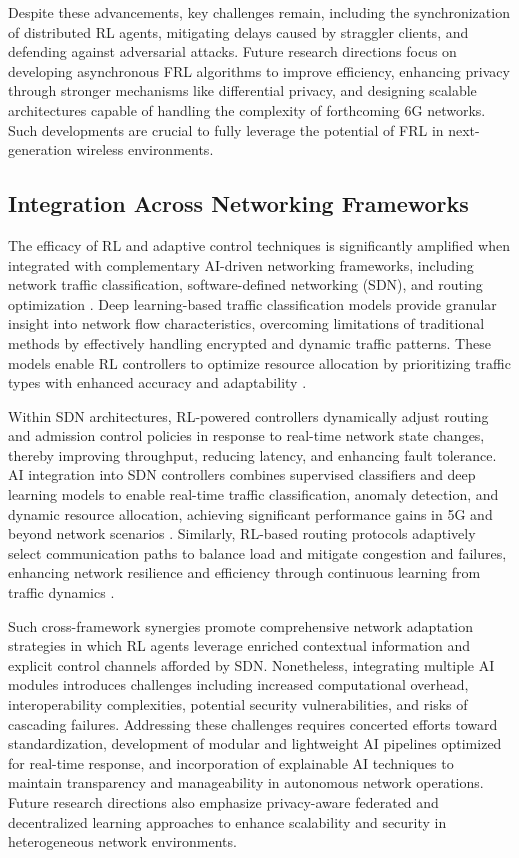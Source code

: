 \documentclass[sigconf]{acmart}
\begin{document}
Despite these advancements, key challenges remain, including the synchronization of distributed RL agents, mitigating delays caused by straggler clients, and defending against adversarial attacks. Future research directions focus on developing asynchronous FRL algorithms to improve efficiency, enhancing privacy through stronger mechanisms like differential privacy, and designing scalable architectures capable of handling the complexity of forthcoming 6G networks. Such developments are crucial to fully leverage the potential of FRL in next-generation wireless environments.

\subsection{Integration Across Networking Frameworks}

The efficacy of RL and adaptive control techniques is significantly amplified when integrated with complementary AI-driven networking frameworks, including network traffic classification, software-defined networking (SDN), and routing optimization \cite{ref51,ref52,ref53}. Deep learning-based traffic classification models provide granular insight into network flow characteristics, overcoming limitations of traditional methods by effectively handling encrypted and dynamic traffic patterns. These models enable RL controllers to optimize resource allocation by prioritizing traffic types with enhanced accuracy and adaptability \cite{ref51}.

Within SDN architectures, RL-powered controllers dynamically adjust routing and admission control policies in response to real-time network state changes, thereby improving throughput, reducing latency, and enhancing fault tolerance. AI integration into SDN controllers combines supervised classifiers and deep learning models to enable real-time traffic classification, anomaly detection, and dynamic resource allocation, achieving significant performance gains in 5G and beyond network scenarios \cite{ref52}. Similarly, RL-based routing protocols adaptively select communication paths to balance load and mitigate congestion and failures, enhancing network resilience and efficiency through continuous learning from traffic dynamics \cite{ref53}.

Such cross-framework synergies promote comprehensive network adaptation strategies in which RL agents leverage enriched contextual information and explicit control channels afforded by SDN. Nonetheless, integrating multiple AI modules introduces challenges including increased computational overhead, interoperability complexities, potential security vulnerabilities, and risks of cascading failures. Addressing these challenges requires concerted efforts toward standardization, development of modular and lightweight AI pipelines optimized for real-time response, and incorporation of explainable AI techniques to maintain transparency and manageability in autonomous network operations. Future research directions also emphasize privacy-aware federated and decentralized learning approaches to enhance scalability and security in heterogeneous network environments.
\end{document}
